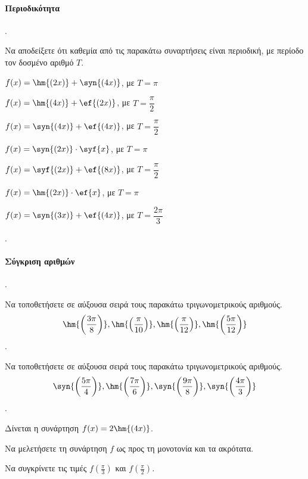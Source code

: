\documentclass[11pt,a4paper,twocolumn]{article}
\newcounter{askhsh}
\newcommand{\askhsh}{\large\theaskhsh.\ \addtocounter{askhsh}{1}}
\begin{document}
\paragraph{Περιοδικότητα}
\askhsh Να αποδείξετε ότι καθεμία από τις παρακάτω συναρτήσεις είναι περιοδική, με περίοδο τον δοσμένο αριθμό $T$.
\begin{alist}
\item $f(x)=\hm{(2x)}+\syn{(4x)}$, με $T=\pi$
\item $f(x)=\hm{(4x)}+\ef{(2x)}$, με $T=\dfrac{\pi}{2}$
\item $f(x)=\syn{(4x)}+\ef{(4x)}$, με $T=\dfrac{\pi}{2}$
\item $f(x)=\syn{(2x)}\cdot\syf{x}$, με $T=\pi$
\item $f(x)=\syf{(2x)}+\ef{(8x)}$, με $T=\dfrac{\pi}{2}$
\item $f(x)=\hm{(2x)}\cdot\ef{x}$, με $T=\pi$
\item $f(x)=\syn{(3x)}+\ef{(4x)}$, με $T=\dfrac{2\pi}{3}$
\end{alist}
\askhsh
\paragraph{Σύγκριση αριθμών}
\askhsh Να τοποθετήσετε σε αύξουσα σειρά τους παρακάτω τριγωνομετρικούς αριθμούς.
\[ \hm{\left(\dfrac{3\pi}{8}\right)},\hm{\left(\dfrac{\pi}{10}\right)},\hm{\left(\dfrac{\pi}{12}\right)},\hm{\left(\dfrac{5\pi}{12}\right)} \]
\askhsh Να τοποθετήσετε σε αύξουσα σειρά τους παρακάτω τριγωνομετρικούς αριθμούς.
\[ \syn{\left(\dfrac{5\pi}{4}\right)},\hm{\left(\dfrac{7\pi}{6}\right)},\syn{\left(\dfrac{9\pi}{8}\right)},\syn{\left(\dfrac{4\pi}{3}\right)} \]
\askhsh Δίνεται η συνάρτηση $f(x)=2\hm{(4x)}$.
\begin{alist}
\item Να μελετήσετε τη συνάρτηση $f$ ως προς τη μονοτονία και τα ακρότατα.
\item Να συγκρίνετε τις τιμές $f\left(\frac{\pi}{3}\right)$ και $f\left(\frac{\pi}{2}\right)$.
\end{alist}
\end{document}
